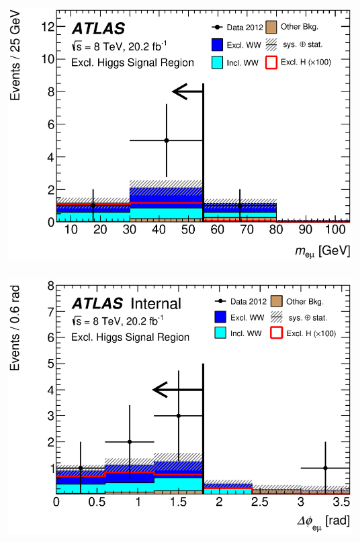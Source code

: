 \begin{figure}[!h]
\begin{subfigure}{0.5\textwidth}
   \includegraphics[width=\textwidth]{figures/emme_CutSR_Mll_nMinus1_MllnMinusOne.eps}
\end{subfigure}
\begin{subfigure}{0.5\textwidth}
   \includegraphics[width=\textwidth]{figures/emme_CutSR_DPhill_nMinus1_DPhillnMinusOne.eps}
\end{subfigure} 
\begin{subfigure}{0.5\textwidth}

\end{subfigure}
\end{figure}
